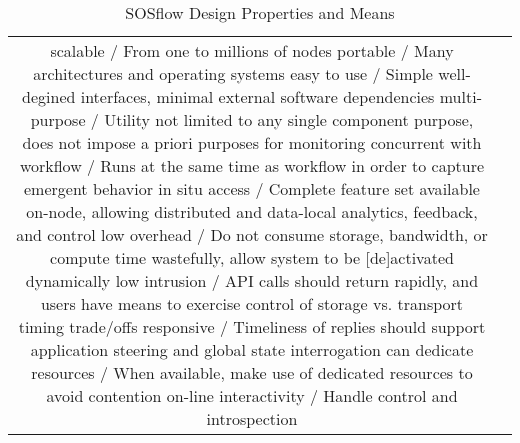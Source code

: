 

\begin{table}[!t]
\renewcommand{\arraystretch}{1.3}
\caption{SOSflow Design Properties and Means}
\label{tabledesign}
\centering
\begin{tabular}{|c|c|}
\hline %
%
scalable                   / From one to millions of nodes
%
\hline %
%
portable                   / Many architectures and operating systems
%
\hline %
%
easy to use                / Simple well-degined interfaces,
                             minimal external software dependencies
%
\hline %
%
multi-purpose              / Utility not limited to any single
                             component purpose, does not impose
                             a priori purposes for monitoring
%
\hline %
%
concurrent with workflow   / Runs at the same time as workflow
                             in order to capture emergent behavior
%
\hline %
%
in situ access             / Complete feature set available on-node,
                             allowing distributed and data-local
                             analytics, feedback, and control
%
\hline %
%
low overhead               / Do not consume storage, bandwidth,
                             or compute time wastefully, allow
                             system to be [de]activated dynamically
%
\hline %
%
low intrusion              / API calls should return rapidly, and
                             users have means to exercise control of
                             storage vs. transport timing trade/offs
%
\hline %
%
responsive                 / Timeliness of replies should support
                             application steering and global
                             state interrogation
%
\hline %
%
can dedicate resources     / When available, make use of dedicated
                             resources to avoid contention
%
\hline %
%
on-line interactivity      / Handle control and introspection

\end{tabular}
\end{table}

